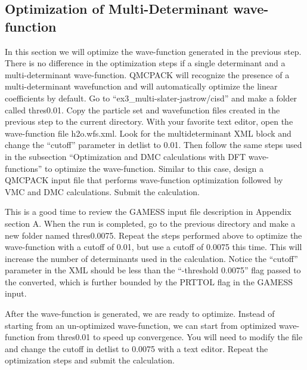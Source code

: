 \subsection{Optimization of Multi-Determinant wave-function}

In this section we will optimize the wave-function generated in the previous step. There
is no difference in the optimization steps if a single determinant and a multi-determinant wave-function.
QMCPACK will recognize the presence of a multi-determinant wavefunction and will automatically 
optimize the linear coefficients by default. Go to ``ex3\_multi-slater-jastrow/cisd'' and make a folder called 
thres0.01. Copy the particle set and wavefunction files created in the previous step to the current 
directory. With your favorite text editor, open the wave-function file h2o.wfs.xml. Look for 
the multideterminant XML block and change the ``cutoff'' parameter in detlist to 0.01. Then follow 
the same steps used in the subsection ``Optimization and DMC calculations with DFT wave-functions''
to optimize the wave-function. Similar to this case, design a QMCPACK input file that performs
wave-function optimization followed by VMC and DMC calculations. Submit the calculation.

This is a good time to review the GAMESS input file description in Appendix section A. 
When the run is completed, go to the previous directory and make a new folder named
thres0.0075. Repeat the steps performed above to optimize the wave-function with a cutoff of 0.01, but use a cutoff of 0.0075 this time. This will increase the number of determinants used in the calculation. Notice the ``cutoff'' parameter in the XML should be less than the ``-threshold 0.0075'' flag passed to the converted, which is further bounded by the PRTTOL flag in the GAMESS input.

After the wave-function is generated, we are ready to optimize. Instead of starting from an un-optimized wave-function, we can start from optimized wave-function from thres0.01 to speed up convergence. You will need to modify the file and change the cutoff in detlist to 0.0075 with a text editor. Repeat the optimization steps and submit the calculation.

